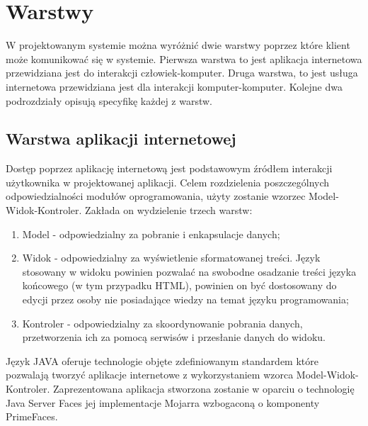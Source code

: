 




\section{Warstwy}
W projektowanym systemie można wyróżnić dwie warstwy poprzez które klient może komunikować się w systemie. Pierwsza warstwa to jest aplikacja internetowa przewidziana jest do interakcji człowiek-komputer. Druga warstwa, to jest usługa internetowa przewidziana jest dla interakcji komputer-komputer. Kolejne dwa podrozdziały opisują specyfikę każdej z warstw.
\subsection{Warstwa aplikacji internetowej}
Dostęp poprzez aplikację internetową jest podstawowym źródłem interakcji użytkownika w projektowanej aplikacji. Celem rozdzielenia poszczególnych odpowiedzialności modułów oprogramowania, użyty zostanie wzorzec Model-Widok-Kontroler. Zakłada on wydzielenie trzech warstw:
\begin{enumerate}
  \item Model - odpowiedzialny za pobranie i enkapsulacje danych;
  \item Widok - odpowiedzialny za wyświetlenie sformatowanej treści. Język stosowany w widoku powinien pozwalać na swobodne osadzanie treści języka końcowego (w tym przypadku HTML), powinien on być dostosowany do edycji przez osoby nie posiadające wiedzy na temat języku programowania;
  \item Kontroler - odpowiedzialny za skoordynowanie pobrania danych, przetworzenia ich za pomocą serwisów i przesłanie danych do widoku.
\end{enumerate}

Język JAVA oferuje technologie objęte zdefiniowanym standardem które pozwalają tworzyć aplikacje internetowe z wykorzystaniem wzorca Model-Widok-Kontroler. Zaprezentowana aplikacja stworzona zostanie w oparciu o technologię Java Server Faces jej implementacje Mojarra wzbogaconą o komponenty PrimeFaces.

